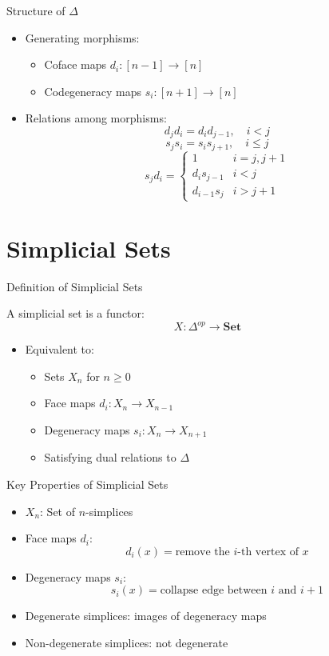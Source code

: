 \documentclass{beamer}
\begin{document}
\begin{frame}{Structure of \(\Delta\)}
  \begin{itemize}
    \item Generating morphisms:
      \begin{itemize}
        \item Coface maps \(d_i: [n-1] \to [n]\)
        \item Codegeneracy maps \(s_i: [n+1] \to [n]\)
      \end{itemize}
    \item Relations among morphisms:
      \[
      d_jd_i = d_id_{j-1}, \quad i < j
      \]
      \[
      s_js_i = s_is_{j+1}, \quad i \leq j
      \]
      \[
      s_jd_i = \begin{cases} 
        1 & i = j, j+1 \\
        d_is_{j-1} & i < j \\
        d_{i-1}s_j & i > j+1
      \end{cases}
      \]
  \end{itemize}
\end{frame}

\section{Simplicial Sets}

\begin{frame}{Definition of Simplicial Sets}
  \begin{definition}
    A simplicial set is a functor:
    \[
    X: \Delta^{op} \to \mathbf{Set}
    \]
  \end{definition}
  \begin{itemize}
    \item Equivalent to:
      \begin{itemize}
        \item Sets \(X_n\) for \(n \geq 0\)
        \item Face maps \(d_i: X_n \to X_{n-1}\)
        \item Degeneracy maps \(s_i: X_n \to X_{n+1}\)
        \item Satisfying dual relations to \(\Delta\)
      \end{itemize}
  \end{itemize}
\end{frame}

\begin{frame}{Key Properties of Simplicial Sets}
  \begin{itemize}
    \item \(X_n\): Set of \(n\)-simplices
    \item Face maps \(d_i\):
      \[
      d_i(x) = \text{remove the } i\text{-th vertex of } x
      \]
    \item Degeneracy maps \(s_i\):
      \[
      s_i(x) = \text{collapse edge between } i \text{ and } i+1
      \]
    \item Degenerate simplices: images of degeneracy maps
    \item Non-degenerate simplices: not degenerate
  \end{itemize}
\end{frame}
\end{document}
